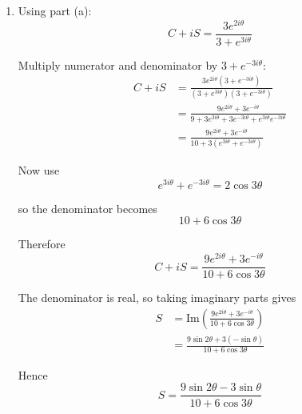\documentclass[leqno]{article}
\begin{document}
\begin{enumerate}[
  label=\textbf{\arabic*.},
  leftmargin=*,
  topsep=0pt,
  partopsep=0pt,
  parsep=0pt
]
\begin{djsSolution}
\begin{enumerate}[label=\textbf{(\alph*)}]
whose sum to infinity is
\[
S_\infty=\dfrac{a}{1-r}\qquad(|r|<1)
\]

Since
\[
|r|=\frac{|e^{3i\theta}|}{3}=\frac13<1
\]

the series converges, so
\begin{align*}
C+iS
&= e^{2i\theta}\frac{1}{1-(-e^{3i\theta}/3)} \\
&= e^{2i\theta}\frac{1}{1+e^{3i\theta}/3} \\
&= \frac{3e^{2i\theta}}{3+e^{3i\theta}}
\end{align*}

  \item Using part (a):
\[
C+iS=\frac{3e^{2i\theta}}{3+e^{3i\theta}}
\]

Multiply numerator and denominator by \(3+e^{-3i\theta}\):
\begin{align*}
C+iS
&= \frac{3e^{2i\theta}(3+e^{-3i\theta})}{(3+e^{3i\theta})(3+e^{-3i\theta})} \\
&= \frac{9e^{2i\theta}+3e^{-i\theta}}{9+3e^{3i\theta}+3e^{-3i\theta}+e^{3i\theta}e^{-3i\theta}} \\
&= \frac{9e^{2i\theta}+3e^{-i\theta}}{10+3\left(e^{3i\theta}+e^{-3i\theta}\right)}
\end{align*}

Now use
\[
e^{3i\theta}+e^{-3i\theta}=2\cos 3\theta
\]

so the denominator becomes
\[
10+6\cos 3\theta
\]

Therefore
\[
C+iS=\frac{9e^{2i\theta}+3e^{-i\theta}}{10+6\cos 3\theta}
\]

The denominator is real, so taking imaginary parts gives
\begin{align*}
S
&= \mathrm{Im}\left(\frac{9e^{2i\theta}+3e^{-i\theta}}{10+6\cos 3\theta}\right) \\
&= \frac{9\sin 2\theta+3(-\sin\theta)}{10+6\cos 3\theta}
\end{align*}

Hence
\[
S=\frac{9\sin 2\theta-3\sin\theta}{10+6\cos 3\theta}
\]
\end{enumerate}
\end{djsSolution}


\newpage

\questionitem


\end{enumerate}
\end{document}
